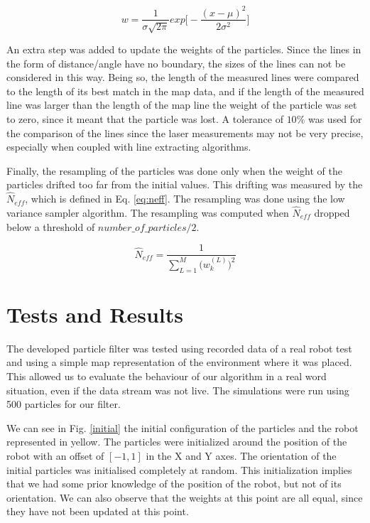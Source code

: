 \documentclass[journal]{IEEEtran}
\begin{document}
\begin{equation}\label{eq:w}
w = \frac{1}{\sigma \sqrt{2\pi}}exp\Bigg[-\frac{(x-\mu)^2}{2\sigma ^2}\Bigg]
\end{equation}

An extra step was added to update the weights of the particles. Since the lines in the form of distance/angle have no boundary, the sizes of the lines can not be considered in this way. Being so, the length of the measured lines were compared to the length of its best match in the map data, and if the length of the measured line was larger than the length of the map line the weight of the particle was set to zero, since it meant that the particle was lost. A tolerance of $10\%$ was used for the comparison of the lines since the laser measurements may not be very precise, especially when coupled with line extracting algorithms.

Finally, the resampling of the particles was done only when the weight of the particles drifted too far from the initial values. This drifting was measured by the $\hat{N}_{eff}$, which is defined in Eq. \ref{eq:neff}. The resampling was done using the low variance sampler algorithm. The resampling was computed when $\hat{N}_{eff}$ dropped below a threshold of $number\_of\_particles/2$.

\begin{equation}\label{eq:neff}
\hat{N}_{eff} = \frac{1}{\sum_{L=1}^{M} \Big(w_k^{(L)}\Big)^2}
\end{equation}






\section{Tests and Results}\label{results}

The developed particle filter was tested using recorded data of a real robot test and using a simple map representation of the environment where it was placed. This allowed us to evaluate the behaviour of our algorithm in a real word situation, even if the data stream was not live. The simulations were run using 500 particles for our filter.

We can see in Fig. \ref{initial} the initial configuration of the particles and the robot represented in yellow. The particles were initialized around the position of the robot with an offset of $[-1,1]$ in the X and Y axes. The orientation of the initial particles was initialised completely at random. This initialization implies that we had some prior knowledge of the position of the robot, but not of its orientation. We can also observe that the weights at this point are all equal, since they have not been updated at this point.
\end{document}
